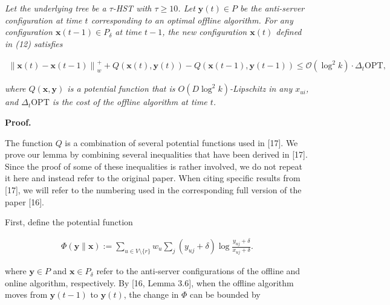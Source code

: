 \documentclass[10pt,a4paper]{article}
\begin{document}
\emph{Let the underlying tree be a $\tau$-HST with $\tau\geq 10$. Let ${\boldsymbol{y}}(t)\in P$ be the anti-server configuration at time $t$ corresponding to an optimal offline algorithm. For any configuration ${\boldsymbol{x}}(t-1)\in P_{\delta}$ at time $t-1$, the new configuration ${\boldsymbol{x}}(t)$ defined in (12) satisfies}\par


\[\begin{gathered}
\displaystyle\left\|{\boldsymbol{x}}(t)-{\boldsymbol{x}}(t-1)\right\|_{w}^{+} \displaystyle+Q({\boldsymbol{x}}(t),{\boldsymbol{y}}(t))-Q({\boldsymbol{x}}(t-1),{\boldsymbol{y}}(t-1))\leq\mathcal{O}\left(\log^{2}k\right)\cdot\Delta_{t}{\text{OPT}},
\end{gathered}\]


\emph{where $Q({\boldsymbol{x}},{\boldsymbol{y}})$ is a potential function that is $O(D\log^{2}k)$-Lipschitz in any $x_{ui}$, and $\Delta_{t}{\text{OPT}}$ is the cost of the offline algorithm at time $t$.}\par






\par\medskip\noindent\textbf{Proof.}\par




The function $Q$ is a combination of several potential functions used in [17]. We prove our lemma by combining several inequalities that have been derived in [17]. Since the proof of some of these inequalities is rather involved, we do not repeat it here and instead refer to the original paper. When citing specific results from [17], we will refer to the numbering used in the corresponding full version of the paper [16].\par




First, define the potential function\par


\[\begin{gathered}
\displaystyle\Phi({\boldsymbol{y}}\parallel{\boldsymbol{x}}) \displaystyle:=\sum_{u\in V\setminus\{r\}}w_{u}\sum_{j}(y_{uj}+\delta)\log\frac{y_{uj}+\delta}{x_{uj}+\delta}.
\end{gathered}\]


where ${\boldsymbol{y}}\in P$ and ${\boldsymbol{x}}\in P_{\delta}$ refer to the anti-server configurations of the offline and online algorithm, respectively. By [16, Lemma 3.6], when the offline algorithm moves from ${\boldsymbol{y}}(t-1)$ to ${\boldsymbol{y}}(t)$, the change in $\Phi$ can be bounded by\par
\end{document}

